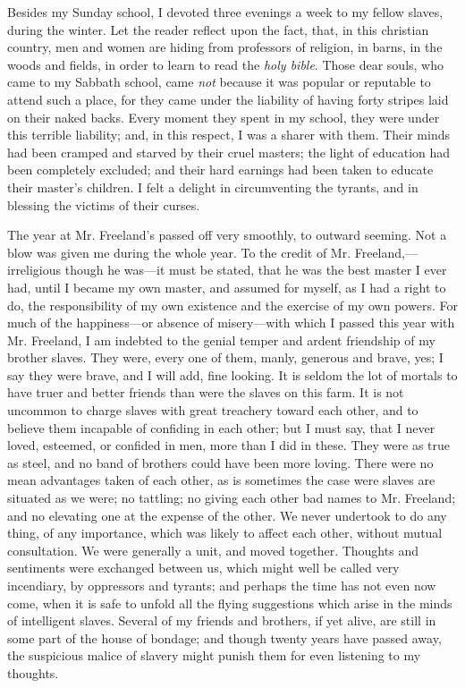 Besides my Sunday school, I devoted three
{\protect\hypertarget{268}{}{}}evenings a week to my fellow slaves,
during the winter. Let the reader reflect upon the fact, that, in this
christian country, men and women are hiding from professors of religion,
in barns, in the woods and fields, in order to learn to read the
\emph{holy bible}. Those dear souls, who came to my Sabbath school, came
\emph{not} because it was popular or reputable to attend such a place,
for they came under the liability of having forty stripes laid on their
naked backs. Every moment they spent in my school, they were under this
terrible liability; and, in this respect, I was a sharer with them.
Their minds had been cramped and starved by their cruel masters; the
light of education had been completely excluded; and their hard earnings
had been taken to educate their master's children. I felt a delight in
circumventing the tyrants, and in blessing the victims of their curses.

The year at Mr. Freeland's passed off very smoothly, to outward seeming.
Not a blow was given me during the whole year. To the credit of Mr.
Freeland,---irreligious though he was---it must be stated, that he was
the best master I ever had, until I became my own master, and assumed
for myself, as I had a right to do, the responsibility of my own
existence and the exercise of my own powers. For much of the
happiness---or absence of misery---with which I passed this year with
Mr. Freeland, I am indebted to the genial temper and ardent friendship
of my brother slaves. They were, every one of them, manly, generous and
brave, yes; I say they were brave, and I will add, fine looking. It is
seldom the lot of mortals to have truer and better friends than were the
slaves {\protect\hypertarget{269}{}{}}on this farm. It is not uncommon
to charge slaves with great treachery toward each other, and to believe
them incapable of confiding in each other; but I must say, that I never
loved, esteemed, or confided in men, more than I did in these. They were
as true as steel, and no band of brothers could have been more loving.
There were no mean advantages taken of each other, as is sometimes the
case were slaves are situated as we were; no tattling; no giving each
other bad names to Mr. Freeland; and no elevating one at the expense of
the other. We never undertook to do any thing, of any importance, which
was likely to affect each other, without mutual consultation. We were
generally a unit, and moved together. Thoughts and sentiments were
exchanged between us, which might well be called very incendiary, by
oppressors and tyrants; and perhaps the time has not even now come, when
it is safe to unfold all the flying suggestions which arise in the minds
of intelligent slaves. Several of my friends and brothers, if yet alive,
are still in some part of the house of bondage; and though twenty years
have passed away, the suspicious malice of slavery might punish them for
even listening to my thoughts.

